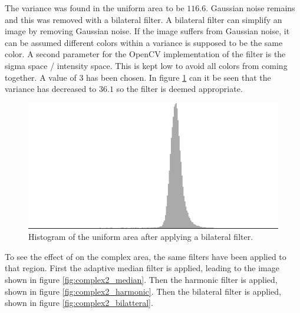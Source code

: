 The variance was found in the uniform area to be $116.6$.
Gaussian noise remains and this was removed with a bilateral filter.
A bilateral filter can simplify an image by removing Gaussian noise.
If the image suffers from Gaussian noise, it can be assumed different colors within a variance is supposed to be the same color.
A second parameter for the OpenCV implementation of the filter is the sigma space / intensity space. 
This is kept low to avoid all colors from coming together. 
A value of 3 has been chosen.
In figure \ref{fig:hist2_bilateral} can it be seen that the variance has decreased to $36.1$ so the filter is deemed appropriate.

\begin{figure}[H]
\centering
\includegraphics[width = \histogramWidth]{graphics/hist2_after_bilatteral.png}
\caption{Histogram of the uniform area after applying a bilateral filter.}
\label{fig:hist2_bilateral}
\end{figure}

To see the effect of on the complex area, the same filters have been applied to that region.
First the adaptive median filter is applied, leading to the image shown in figure \ref{fig:complex2_median}.
Then the harmonic filter is applied, shown in figure \ref{fig:complex2_harmonic}.
Then the bilateral filter is applied, shown in figure \ref{fig:complex2_bilatteral}.


